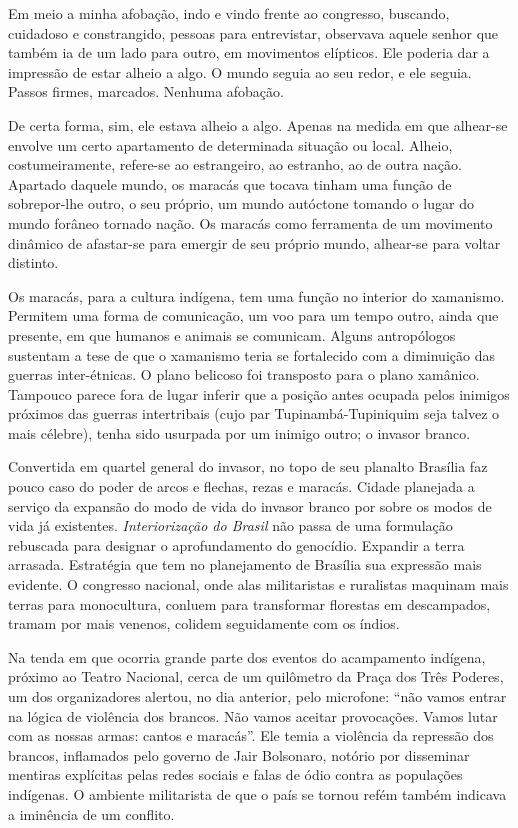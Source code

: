 Em meio a minha afobação, indo e vindo frente ao congresso, buscando,
cuidadoso e constrangido, pessoas para entrevistar, observava aquele
senhor que também ia de um lado para outro, em movimentos elípticos. Ele
poderia dar a impressão de estar alheio a algo. O mundo seguia ao seu
redor, e ele seguia. Passos firmes, marcados. Nenhuma afobação.

De certa forma, sim, ele estava alheio a algo. Apenas na medida em que
alhear-se envolve um certo apartamento de determinada situação ou local.
Alheio, costumeiramente, refere-se ao estrangeiro, ao estranho, ao de
outra nação. Apartado daquele mundo, os maracás que tocava tinham uma
função de sobrepor-lhe outro, o seu próprio, um mundo autóctone tomando
o lugar do mundo forâneo tornado nação. Os maracás como ferramenta de um
movimento dinâmico de afastar-se para emergir de seu próprio mundo,
alhear-se para voltar distinto.

Os maracás, para a cultura indígena, tem uma função no interior do
xamanismo. Permitem uma forma de comunicação, um voo para um tempo
outro, ainda que presente, em que humanos e animais se comunicam. Alguns
antropólogos sustentam a tese de que o xamanismo teria se fortalecido
com a diminuição das guerras inter-étnicas. O plano belicoso foi
transposto para o plano xamânico. Tampouco parece fora de lugar inferir
que a posição antes ocupada pelos inimigos próximos das guerras
intertribais (cujo par Tupinambá-Tupiniquim seja talvez o mais célebre),
tenha sido usurpada por um inimigo outro; o invasor branco.

Convertida em quartel general do invasor, no topo de seu planalto
Brasília faz pouco caso do poder de arcos e flechas, rezas e maracás.
Cidade planejada a serviço da expansão do modo de vida do invasor branco
por sobre os modos de vida já existentes. \emph{Interiorização do
Brasil} não passa de uma formulação rebuscada para designar o
aprofundamento do genocídio. Expandir a terra arrasada. Estratégia que
tem no planejamento de Brasília sua expressão mais evidente. O congresso
nacional, onde alas militaristas e ruralistas maquinam mais terras para
monocultura, conluem para transformar florestas em descampados, tramam
por mais venenos, colidem seguidamente com os índios.

Na tenda em que ocorria grande parte dos eventos do acampamento
indígena, próximo ao Teatro Nacional, cerca de um quilômetro da Praça
dos Três Poderes, um dos organizadores alertou, no dia anterior, pelo
microfone: ``não vamos entrar na lógica de violência dos brancos. Não
vamos aceitar provocações. Vamos lutar com as nossas armas: cantos e
maracás''. Ele temia a violência da repressão dos brancos, inflamados
pelo governo de Jair Bolsonaro, notório por disseminar mentiras
explícitas pelas redes sociais e falas de ódio contra as populações
indígenas. O ambiente militarista de que o país se tornou refém também
indicava a iminência de um conflito.

